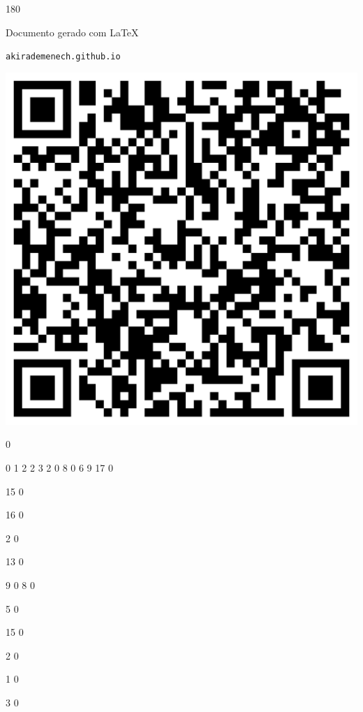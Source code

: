 \documentclass[12pt]{article}
\begin{document}
	\begin{turn}{180}	
		\begin{minipage}{\textwidth}		  
		  Documento gerado com \LaTeX			
		  
		  \texttt{akirademenech.github.io}

		  \includegraphics[height=0.3\textheight]{2e-2.pdf}

		\end{minipage}	
	\end{turn}  
		  
		\vfill  
		  
{
	0	%

	0	%
	1	%
	2	%
	2	%
	3	%
	2	%
	0	%
	8	%
	0	%
	6	%
	9	%
	17	%
	0	%

	15	%
	0	%

	16	%
	0	%

	2	%
	0	%

	13	%
	0	%

	9	%
	0	%
	8	%
	0	%

	5	%
	0	%

	15	%
	0	%

	2	%
	0	%

	1	%
	0	%

	3	%
	0	%

}	  
		    	
\end{document}
